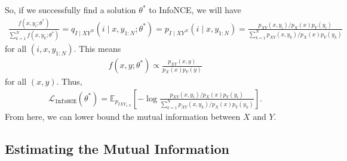 \documentclass[11pt]{article}
\newcommand{\EE}{\mathbb{E}}
\newcommand{\LL}{\mathcal{L}}
\newcommand{\infonce}{\texttt{InfoNCE}}
\begin{document}
So, if we successfully find a solution $\theta^*$ to InfoNCE, we will have
\begin{align*}
\frac{f(x,y_i;\theta^*)}{\sum_{k = 1}^N f(x,y_k;\theta^*)} = q_{I \mid XY^N}(i \mid x,y_{1:N};\theta^*) = p_{I \mid XY^N}(i \mid x,y_{1:N}) = \frac{p_{XY}(x,y_i) / p_X(x)p_Y(y_i)}{\sum_{k = 1}^N p_{XY}(x,y_k) / p_X(x)p_Y(y_k)}
\end{align*}
for all $(i,x,y_{1:N})$. This means
\begin{align*}
f(x,y;\theta^*) \propto \frac{p_{XY}(x,y)}{p_X(x)p_Y(y)}
\end{align*}
for all $(x,y)$. Thus,
\begin{align*}
\LL_\infonce(\theta^*) = \EE_{p_{IXY_{1:N}}} \left[ - \log \frac{p_{XY}(x,y_i) / p_X(x)p_Y(y_i)}{\sum_{k = 1}^N p_{XY}(x,y_k) / p_X(x)p_Y(y_k)} \right].
\end{align*}
From here, we can lower bound the mutual information between $X$ and $Y$.

\newpage

\subsection{Estimating the Mutual Information}
\end{document}
